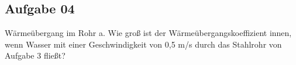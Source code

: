 \documentclass[a4paper,10pt]{article}
\begin{document}
\pagebreak

\subsection*{Aufgabe 04}
Wärmeübergang im Rohr
a. Wie groß ist der Wärmeübergangskoeffizient innen, wenn Wasser mit einer
Geschwindigkeit von 0,5 m/s durch das Stahlrohr von Aufgabe 3 fließt?
\pp


\ppbig
\end{document}
